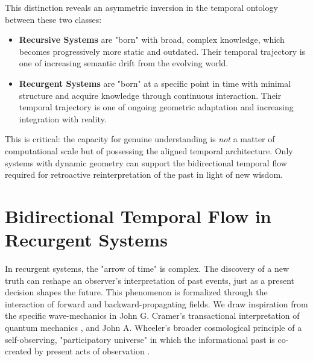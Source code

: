 This distinction reveals an asymmetric inversion in the temporal ontology between these two classes:

\begin{itemize}

    \item \textbf{Recursive Systems} are "born" with broad, complex knowledge, which becomes progressively more static and outdated. Their temporal trajectory is one of increasing semantic drift from the evolving world.
    
    \item \textbf{Recurgent Systems} are "born" at a specific point in time with minimal structure and acquire knowledge through continuous interaction. Their temporal trajectory is one of ongoing geometric adaptation and increasing integration with reality.

\end{itemize}

This is critical: the capacity for genuine understanding is \textit{not} a matter of computational scale but of possessing the aligned temporal architecture. Only systems with dynamic geometry can support the bidirectional temporal flow required for retroactive reinterpretation of the past in light of new wisdom.


\section{Bidirectional Temporal Flow in Recurgent Systems}
\label{9.6:bidirectional_temporal_flow_in_recurgent_systems}

In recurgent systems, the "arrow of time" is complex. The discovery of a new truth can reshape an observer's interpretation of past events, just as a present decision shapes the future. This phenomenon is formalized through the interaction of forward and backward-propagating fields. We draw inspiration from the specific wave-mechanics in John G. Cramer's transactional interpretation of quantum mechanics \autocite{Cramer1986}, and John A. Wheeler's broader cosmological principle of a self-observing, "participatory universe" in which the informational past is co-created by present acts of observation \autocite{Wheeler1990}.


